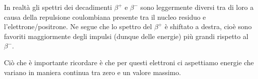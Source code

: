 \vspace{0.2cm}In realtà gli spettri dei decadimenti $\beta^+$ e $\beta^-$ sono leggermente diversi tra di loro a causa della repulsione coulombiana presente tra il nucleo residuo e l'elettrone/positrone. Ne segue che lo spettro del $\beta^+$ è shiftato a destra, cioè sono favoriti maggiormente degli impulsi (dunque delle energie) più grandi rispetto al $\beta^-$.

Ciò che è importante ricordare è che per questi elettroni ci aspettiamo energie che variano in maniera continua tra zero e un valore massimo.


